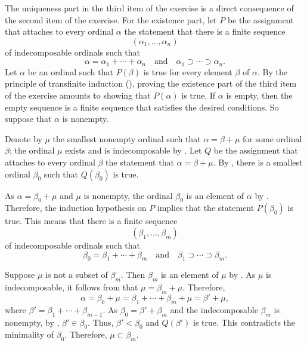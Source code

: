 \documentclass{article}
\begin{document}
\begin{solution}[\ref{exe:fdb94svq}]
  The uniqueness part in the third item of the exercise is a direct
  consequence of the second item of the exercise.  For the existence
  part, let \(P\) be the assignment that attaches to every ordinal
  \(\alpha\) the statement that there is a finite sequence
  \begin{displaymath}
    (\alpha_1, \dotsc, \alpha_n)
  \end{displaymath}
  of indecomposable ordinals such that
  \begin{displaymath}
    \alpha = \alpha_1 + \dotsb + \alpha_n
    \quad \text{and} \quad
    \alpha_1 \supset \dotsb \supset \alpha_n.
  \end{displaymath}
  Let \(\alpha\) be an ordinal such that \(P(\beta)\) is true for
  every element \(\beta\) of \(\alpha\).  By the principle of
  transfinite induction (), proving the existence
  part of the third item of the exercise amounts to showing that
  \(P(\alpha)\) is true.  If \(\alpha\) is empty, then the empty
  sequence is a finite sequence that satisfies the desired conditions.
  So suppose that \(\alpha\) is nonempty.

  Denote by \(\mu\) the smallest nonempty ordinal such that
  \(\alpha = \beta + \mu\) for some ordinal \(\beta\); the ordinal
  \(\mu\) exists and is indecomposable by .  Let
  \(Q\) be the assignment that attaches to every ordinal \(\beta\) the
  statement that \(\alpha = \beta + \mu\).  By ,
  there is a smallest ordinal \(\beta_0\) such that \(Q(\beta_0)\) is
  true.

  As \(\alpha = \beta_0 + \mu\) and \(\mu\) is nonempty, the ordinal
  \(\beta_0\) is an element of \(\alpha\) by .
  Therefore, the induction hypothesis on \(P\) implies that the
  statement \(P(\beta_0)\) is true.  This means that there is a finite
  sequence
  \begin{displaymath}
    (\beta_1, \dotsc, \beta_m)
  \end{displaymath}
  of indecomposable ordinals such that
  \begin{displaymath}
    \beta_0 = \beta_1 + \dotsb + \beta_m
    \quad \text{and} \quad
    \beta_1 \supset \dotsb \supset \beta_m.
  \end{displaymath}

  Suppose \(\mu\) is not a subset of \(\beta_m\).  Then \(\beta_m\) is
  an element of \(\mu\) by .  As
  \(\mu\) is indecomposable, it follows from  that
  \(\mu = \beta_m + \mu\).  Therefore,
  \begin{displaymath}
    \alpha = \beta_0 + \mu = \beta_1 + \dotsb + \beta_m + \mu =
    \beta' + \mu,
  \end{displaymath}
  where \(\beta' = \beta_1 + \dotsb + \beta_{m-1}\).  As
  \(\beta_0 = \beta' + \beta_m\) and the indecomposable \(\beta_m\) is
  nonempty, by , \(\beta' \in \beta_0\).  Thus,
  \(\beta' < \beta_0\) and \(Q(\beta')\) is true.  This contradicts
  the minimality of \(\beta_0\).  Therefore, \(\mu \subset \beta_m\).


\end{solution}
\end{document}
